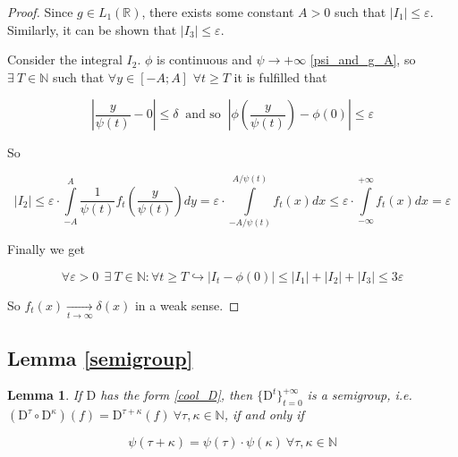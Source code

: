 \documentclass{article}
\newtheorem*{lemma-non}{Lemma}
\begin{document}
\begin{proof}
        Since $g \in L_1(\mathbb{R})$, there exists some constant $A > 0$ such that $\left|I_1\right| \leq \varepsilon$. Similarly, it can be shown that $\left|I_3\right| \leq \varepsilon$.

        Consider the integral $I_2$. $\phi$ is continuous and $\psi \to +\infty$ \eqref{psi_and_g_A}, so $\exists~ T \in \mathbb{N}$ such that $\forall y \in [-A; A]$ $\forall t \geq T$ it is fulfilled that 

        \begin{equation*}
            \left|\frac{y}{\psi(t)} - 0\right| \leq \delta ~\text{ and so }~ \left|\phi\left(\frac{y}{\psi(t)}\right) - \phi(0)\right| \leq \varepsilon
        \end{equation*}

        So

        \begin{equation*}
            \left|I_2\right| \leq \varepsilon \cdot \int\limits_{-A}^{A} \dfrac{1}{\psi(t)} f_t\left(\frac{y}{\psi(t)}\right) dy = 
            \varepsilon \cdot \int\limits_{-A/\psi(t)}^{A/\psi(t)} f_t\left(x\right) dx \leq \varepsilon \cdot \int\limits_{-\infty}^{+\infty} f_t\left(x\right) dx = \varepsilon
        \end{equation*}

        Finally we get

        \begin{equation*}
            \forall \varepsilon > 0 ~~ \exists~ T \in \mathbb{N} : \forall t \geq T \hookrightarrow \left|I_t - \phi(0)\right| \leq 
            \left|I_1\right| + \left|I_2\right| + \left|I_3\right| \leq 3\varepsilon
        \end{equation*}

        So $f_t(x) \underset{t \to \infty}{\longrightarrow} \delta(x)$ in a weak sense.

    \end{proof}

    \subsection{Lemma \ref{semigroup}} \label{pr_semigroup}
    \begin{lemma-non}
    
        If $\text{D}$ has the form \eqref{cool_D}, then $\{\text{D}^t\}_{t=0}^{+\infty}$ is a semigroup, i.e. $(\text{D}^{\tau} \circ \text{D}^{\kappa})(f) = \text{D}^{\tau + \kappa}(f) ~\forall \tau, \kappa \in \mathbb{N}$, if and only if 

        \begin{equation}
            \psi(\tau + \kappa) = \psi(\tau) \cdot \psi(\kappa) ~\forall \tau, \kappa \in \mathbb{N}
        \end{equation}
        
    \end{lemma-non}
\end{document}
